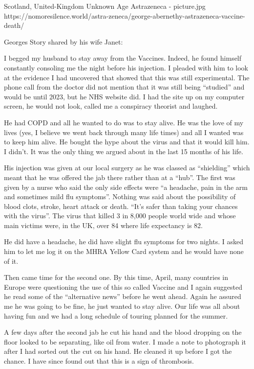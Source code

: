 {Scotland, United-Kingdom}
{Unknown Age}
{Astrazeneca}
{}
{-}
{picture.jpg}
{https://nomoresilence.world/astra-zeneca/george-abernethy-astrazeneca-vaccine-death/}
{

\normalsize

Georges Story shared by his wife Janet:

I begged my husband to stay away from the Vaccines. Indeed, he found himself constantly consoling me the night before his injection. I pleaded with him to look at the evidence I had uncovered that showed that this was still experimental. The phone call from the doctor did not mention that it was still being “studied” and would be until 2023, but he NHS website did. I had the site up on my computer screen, he would not look, called me a conspiracy theorist and laughed.

He had COPD and all he wanted to do was to stay alive. He was the love of my lives (yes, I believe we went back through many life times) and all I wanted was to keep him alive. He bought the hype about the virus and that it would kill him. I didn’t. It was the only thing we argued about in the last 15 months of his life.

His injection was given at our local surgery as he was classed as “shielding” which meant that he was offered the jab there rather than at a “hub”. The first was given by a nurse who said the only side effects were “a headache, pain in the arm and sometimes mild flu symptoms”. Nothing was said about the possibility of blood clots, stroke, heart attack or death. “It’s safer than taking your chances with the virus”. The virus that killed 3 in 8,000 people world wide and whose main victims were, in the UK, over 84 where life expectancy is 82.

He did have a headache, he did have slight flu symptoms for two nights. I asked him to let me log it on the MHRA Yellow Card system and he would have none of it.

Then came time for the second one. By this time, April, many countries in Europe were questioning the use of this so called Vaccine and I again suggested he read some of the “alternative news” before he went ahead. Again he assured me he was going to be fine, he just wanted to stay alive. Our life was all about having fun and we had a long schedule of touring planned for the summer.

A few days after the second jab he cut his hand and the blood dropping on the floor looked to be separating, like oil from water. I made a note to photograph it after I had sorted out the cut on his hand. He cleaned it up before I got the chance. I have since found out that this is a sign of thrombosis.

}
